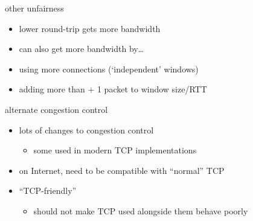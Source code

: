 \begin{frame}{other unfairness}
    \begin{itemize}
    \item lower round-trip gets more bandwidth
    \item can also get more bandwidth by\ldots
    \vspace{.5cm}
    \item using more connections (`independent' windows)
    \item adding more than + 1 packet to window size/RTT
    \end{itemize}
\end{frame}

\begin{frame}{alternate congestion control}
    \begin{itemize}
    \item lots of changes to congestion control
        \begin{itemize}
        \item some used in modern TCP implementations
        \end{itemize}
    \vspace{.5cm}
    \item on Internet, need to be compatible with ``normal'' TCP
    \item ``TCP-friendly''
        \begin{itemize}
        \item should not make TCP used alongside them behave poorly
        \end{itemize}
    \end{itemize}
\end{frame}
